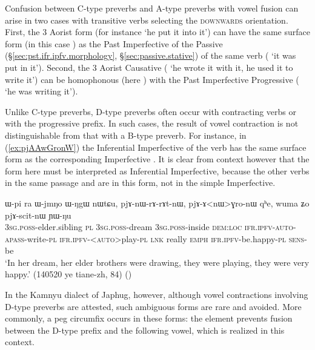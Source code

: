 Confusion between C-type preverbs and A-type preverbs with vowel fusion can arise in two cases with transitive verbs selecting  the \textsc{downwards} orientation. First, the 3\flobv{} Aorist form (for instance  `he put it into it') can have the same surface form (in this case ) as the Past Imperfective of the Passive (§\ref{sec:pst.ifr.ipfv.morphology}, §\ref{sec:passive.stative}) of the same verb ( `it was put in it'). Second, the 3\flobv{} Aorist Causative ( `he wrote it with it, he used it to write it') can be homophonous (here ) with the Past Imperfective  Progressive ( `he was writing it').

Unlike C-type preverbs, D-type preverbs often occur with contracting verbs or with the progressive prefix. In such cases, the result of vowel contraction is not distinguishable from that with a B-type preverb. For instance, in (\ref{ex:pjAAwGronW}) the Inferential Imperfective  of the verb  has the same surface form  as the corresponding Imperfective  . It is clear from context however that the form here must be interpreted as Inferential Imperfective, because the other verbs in the same passage  and  are in this form, not in the simple Imperfective.

\begin{exe}
\ex \label{ex:pjAAwGronW}
 \gll ɯ-pi ra ɯ-jmŋo ɯ-ŋgɯ nɯtɕu, pjɤ-nɯ-rɤ-rɤt-nɯ, pjɤ-ɤ<nɯ>ɣro-nɯ qʰe, wuma ʑo pjɤ-scit-nɯ ɲɯ-ŋu \\
 \textsc{3sg}.\textsc{poss}-elder.sibling \textsc{pl} \textsc{3sg}.\textsc{poss}-dream \textsc{3sg}.\textsc{poss}-inside \textsc{dem}:\textsc{loc} \textsc{ifr}.\textsc{ipfv}-\textsc{auto}-\textsc{apass}-write-\textsc{pl}  \textsc{ifr}.\textsc{ipfv}-<\textsc{auto}>play-\textsc{pl} \textsc{lnk} really \textsc{emph} \textsc{ifr}.\textsc{ipfv}-be.happy-\textsc{pl} \textsc{sens}-be \\
 \glt `In her dream, her elder brothers were drawing, they were playing, they were very happy.' (140520 ye tiane-zh, 84)
()
\end{exe}

In the Kamnyu dialect of Japhug, however, although vowel contractions involving D-type preverbs are attested, such ambiguous forms are rare and avoided. More commonly, a peg circumfix  occurs in these forms: the  element prevents fusion between the D-type prefix and the following vowel, which is realized  in this context. 

